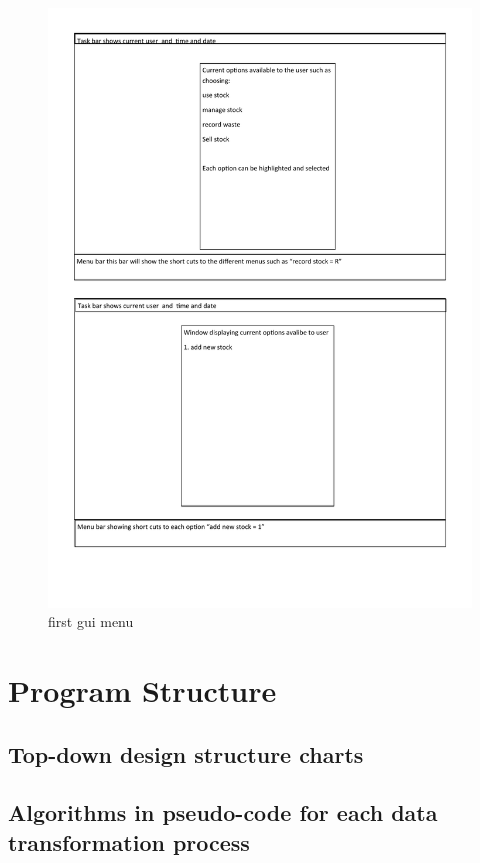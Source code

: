 \begin{figure}[H]
    \includegraphics[width=\textwidth]{./Design/pdfimages/gui.pdf}
    \caption{first gui menu} \label{fig:gui homescreen}
\end{figure}



\section{Program Structure}

\subsection{Top-down design structure charts}

\subsection{Algorithms in pseudo-code for each data transformation process}

